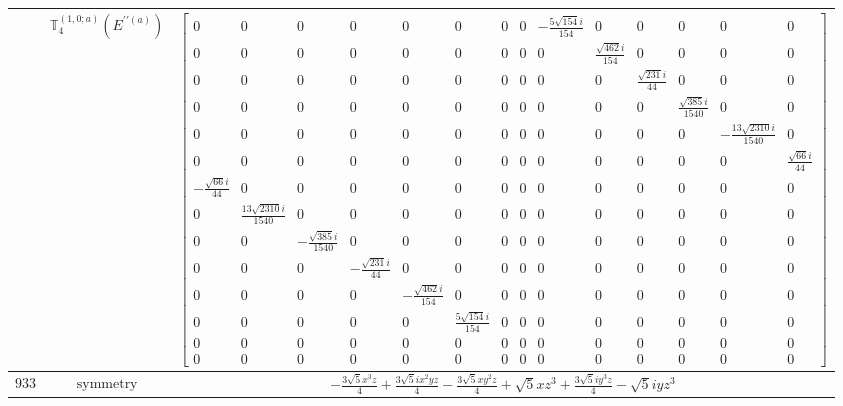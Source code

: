 \documentclass[fleqn,8pt,landscape]{jsarticle}
\begin{document}
\begin{longtable}{ccc}
$  $ & $ \mathbb{T}_{4}^{(1,0;a)}(E^{\prime\prime(a)}) $ & $ \begin{bmatrix} 0 & 0 & 0 & 0 & 0 & 0 & 0 & 0 & - \frac{5 \sqrt{154} i}{154} & 0 & 0 & 0 & 0 & 0 \\ 0 & 0 & 0 & 0 & 0 & 0 & 0 & 0 & 0 & \frac{\sqrt{462} i}{154} & 0 & 0 & 0 & 0 \\ 0 & 0 & 0 & 0 & 0 & 0 & 0 & 0 & 0 & 0 & \frac{\sqrt{231} i}{44} & 0 & 0 & 0 \\ 0 & 0 & 0 & 0 & 0 & 0 & 0 & 0 & 0 & 0 & 0 & \frac{\sqrt{385} i}{1540} & 0 & 0 \\ 0 & 0 & 0 & 0 & 0 & 0 & 0 & 0 & 0 & 0 & 0 & 0 & - \frac{13 \sqrt{2310} i}{1540} & 0 \\ 0 & 0 & 0 & 0 & 0 & 0 & 0 & 0 & 0 & 0 & 0 & 0 & 0 & \frac{\sqrt{66} i}{44} \\ - \frac{\sqrt{66} i}{44} & 0 & 0 & 0 & 0 & 0 & 0 & 0 & 0 & 0 & 0 & 0 & 0 & 0 \\ 0 & \frac{13 \sqrt{2310} i}{1540} & 0 & 0 & 0 & 0 & 0 & 0 & 0 & 0 & 0 & 0 & 0 & 0 \\ 0 & 0 & - \frac{\sqrt{385} i}{1540} & 0 & 0 & 0 & 0 & 0 & 0 & 0 & 0 & 0 & 0 & 0 \\ 0 & 0 & 0 & - \frac{\sqrt{231} i}{44} & 0 & 0 & 0 & 0 & 0 & 0 & 0 & 0 & 0 & 0 \\ 0 & 0 & 0 & 0 & - \frac{\sqrt{462} i}{154} & 0 & 0 & 0 & 0 & 0 & 0 & 0 & 0 & 0 \\ 0 & 0 & 0 & 0 & 0 & \frac{5 \sqrt{154} i}{154} & 0 & 0 & 0 & 0 & 0 & 0 & 0 & 0 \\ 0 & 0 & 0 & 0 & 0 & 0 & 0 & 0 & 0 & 0 & 0 & 0 & 0 & 0 \\ 0 & 0 & 0 & 0 & 0 & 0 & 0 & 0 & 0 & 0 & 0 & 0 & 0 & 0 \end{bmatrix} $ \\ \hline
$ 933 $ & $ \text{symmetry} $ & $ - \frac{3 \sqrt{5} x^{3} z}{4} + \frac{3 \sqrt{5} i x^{2} y z}{4} - \frac{3 \sqrt{5} x y^{2} z}{4} + \sqrt{5} x z^{3} + \frac{3 \sqrt{5} i y^{3} z}{4} - \sqrt{5} i y z^{3} $ \\

\end{longtable}
\end{document}
